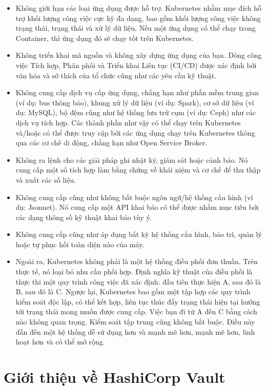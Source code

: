 \documentclass[12pt,a4paper]{report}
\begin{document}
	\begin{itemize}
		\item Không giới hạn các loại ứng dụng được hỗ trợ. Kubernetes nhằm mục đích hỗ trợ khối lượng công việc cực kỳ đa dạng, bao gồm khối lượng công việc không trạng thái, trạng thái và xử lý dữ liệu. Nếu một ứng dụng có thể chạy trong Container, thì ứng dụng đó sẽ chạy tốt trên Kubernetes.
		\item Không triển khai mã nguồn và không xây dựng ứng dụng của bạn. Dòng công việc Tích hợp, Phân phối và Triển khai Liên tục (CI/CD) được xác định bởi văn hóa và sở thích của tổ chức cũng như các yêu cầu kỹ thuật.
		\item Không cung cấp dịch vụ cấp ứng dụng, chẳng hạn như phần mềm trung gian (ví dụ: bus thông báo), khung xử lý dữ liệu (ví dụ: Spark), cơ sở dữ liệu (ví dụ: MySQL), bộ đệm cũng như hệ thống lưu trữ cụm (ví dụ: Ceph) như các dịch vụ tích hợp. Các thành phần như vậy có thể chạy trên Kubernetes và/hoặc có thể được truy cập bởi các ứng dụng chạy trên Kubernetes thông qua các cơ chế di động, chẳng hạn như Open Service Broker.
		\item Không ra lệnh cho các giải pháp ghi nhật ký, giám sát hoặc cảnh báo. Nó cung cấp một số tích hợp làm bằng chứng về khái niệm và cơ chế để thu thập và xuất các số liệu.
		\item Không cung cấp cũng như không bắt buộc ngôn ngữ/hệ thống cấu hình (ví dụ: Jsonnet). Nó cung cấp một API khai báo có thể được nhắm mục tiêu bởi các dạng thông số kỹ thuật khai báo tùy ý.
		\item Không cung cấp cũng như áp dụng bất kỳ hệ thống cấu hình, bảo trì, quản lý hoặc tự phục hồi toàn diện nào của máy.
		\item Ngoài ra, Kubernetes không phải là một hệ thống điều phối đơn thuần. Trên thực tế, nó loại bỏ nhu cầu phối hợp. Định nghĩa kỹ thuật của điều phối là thực thi một quy trình công việc đã xác định: đầu tiên thực hiện A, sau đó là B, sau đó là C. Ngược lại, Kubernetes bao gồm một tập hợp các quy trình kiểm soát độc lập, có thể kết hợp, liên tục thúc đẩy trạng thái hiện tại hướng tới trạng thái mong muốn được cung cấp. Việc bạn đi từ A đến C bằng cách nào không quan trọng. Kiểm soát tập trung cũng không bắt buộc. Điều này dẫn đến một hệ thống dễ sử dụng hơn và mạnh mẽ hơn, mạnh mẽ hơn, linh hoạt hơn và có thể mở rộng.
	\end{itemize}


	\chapter{Giới thiệu về HashiCorp Vault}
	
\end{document}
